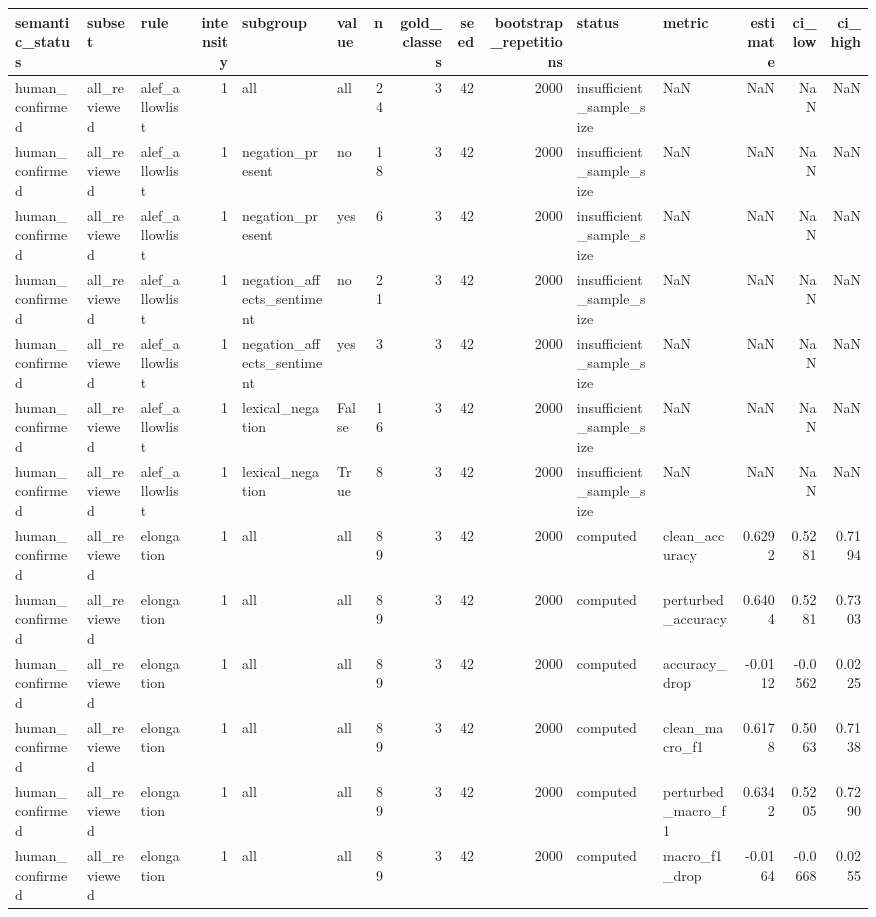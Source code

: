 \begin{tabular}{lllrllrrrrllrrr}
\toprule
semantic_status & subset & rule & intensity & subgroup & value & n & gold_classes & seed & bootstrap_repetitions & status & metric & estimate & ci_low & ci_high \\
\midrule
human_confirmed & all_reviewed & alef_allowlist & 1 & all & all & 24 & 3 & 42 & 2000 & insufficient_sample_size & NaN & NaN & NaN & NaN \\
human_confirmed & all_reviewed & alef_allowlist & 1 & negation_present & no & 18 & 3 & 42 & 2000 & insufficient_sample_size & NaN & NaN & NaN & NaN \\
human_confirmed & all_reviewed & alef_allowlist & 1 & negation_present & yes & 6 & 3 & 42 & 2000 & insufficient_sample_size & NaN & NaN & NaN & NaN \\
human_confirmed & all_reviewed & alef_allowlist & 1 & negation_affects_sentiment & no & 21 & 3 & 42 & 2000 & insufficient_sample_size & NaN & NaN & NaN & NaN \\
human_confirmed & all_reviewed & alef_allowlist & 1 & negation_affects_sentiment & yes & 3 & 3 & 42 & 2000 & insufficient_sample_size & NaN & NaN & NaN & NaN \\
human_confirmed & all_reviewed & alef_allowlist & 1 & lexical_negation & False & 16 & 3 & 42 & 2000 & insufficient_sample_size & NaN & NaN & NaN & NaN \\
human_confirmed & all_reviewed & alef_allowlist & 1 & lexical_negation & True & 8 & 3 & 42 & 2000 & insufficient_sample_size & NaN & NaN & NaN & NaN \\
human_confirmed & all_reviewed & elongation & 1 & all & all & 89 & 3 & 42 & 2000 & computed & clean_accuracy & 0.6292 & 0.5281 & 0.7194 \\
human_confirmed & all_reviewed & elongation & 1 & all & all & 89 & 3 & 42 & 2000 & computed & perturbed_accuracy & 0.6404 & 0.5281 & 0.7303 \\
human_confirmed & all_reviewed & elongation & 1 & all & all & 89 & 3 & 42 & 2000 & computed & accuracy_drop & -0.0112 & -0.0562 & 0.0225 \\
human_confirmed & all_reviewed & elongation & 1 & all & all & 89 & 3 & 42 & 2000 & computed & clean_macro_f1 & 0.6178 & 0.5063 & 0.7138 \\
human_confirmed & all_reviewed & elongation & 1 & all & all & 89 & 3 & 42 & 2000 & computed & perturbed_macro_f1 & 0.6342 & 0.5205 & 0.7290 \\
human_confirmed & all_reviewed & elongation & 1 & all & all & 89 & 3 & 42 & 2000 & computed & macro_f1_drop & -0.0164 & -0.0668 & 0.0255 \\

\end{tabular}
